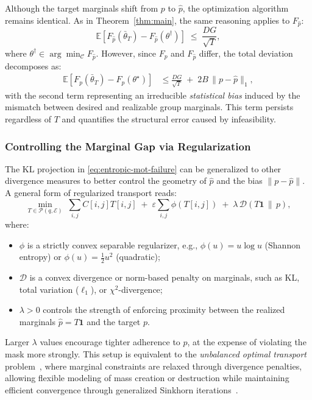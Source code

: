 \documentclass[9pt]{extarticle}
\theoremstyle{definition}
\renewcommand{\paragraph}[1]{\par\medskip\noindent{\bf #1}\hspace{0.5em}\ignorespaces}
\begin{document}
\paragraph{Convergence rate under infeasibility.}
Although the target marginals shift from $p$ to $\hat{p}$, the optimization algorithm remains identical.
As in Theorem~\ref{thm:main}, the same reasoning applies to $F_{\hat{p}}$:
\begin{equation}\label{eq:rate-hatp}
\mathbb{E}\!\left[F_{\hat{p}}(\bar{\theta}_T) - F_{\hat{p}}(\theta^\dagger)\right]
\;\le\; \frac{DG}{\sqrt{T}},
\end{equation}
where $\theta^\dagger\in\arg\min_{\mathcal{C}} F_{\hat{p}}$.
However, since $F_p$ and $F_{\hat{p}}$ differ, the total deviation decomposes as:
\begin{align}
\mathbb{E}\!\left[F_p(\bar{\theta}_T) - F_p(\theta^\star)\right]
&\le \frac{DG}{\sqrt{T}} \;+\; 2B\,\|p-\hat{p}\|_1,
\label{eq:infeasible-rate}
\end{align}
with the second term representing an irreducible \emph{statistical bias} induced by the mismatch between desired and realizable group marginals.
This term persists regardless of $T$ and quantifies the structural error caused by infeasibility.
\subsubsection{Controlling the Marginal Gap via Regularization}
The KL projection in \eqref{eq:entropic-mot-failure} can be generalized to other divergence measures to better control the geometry of $\hat{p}$ and the bias $\|p-\hat{p}\|$.
A general form of regularized transport reads:
\begin{equation}\label{eq:general-reg-failure}
\min_{T\in\mathcal{P}(q,\mathcal{E})}\;
\sum_{i,j} C[i,j]T[i,j]
\;+\;\varepsilon \sum_{i,j}\phi(T[i,j])
\;+\;\lambda\,\mathcal{D}\!\left(T\mathbf{1}\,\|\,p\right),
\end{equation}
where:
\begin{itemize}
    \item $\phi$ is a strictly convex separable regularizer, e.g., $\phi(u)=u\log u$ (Shannon entropy) or $\phi(u)=\tfrac{1}{2}u^2$ (quadratic);
    \item $\mathcal{D}$ is a convex divergence or norm-based penalty on marginals, such as KL, total variation ($\ell_1$), or $\chi^2$-divergence;
    \item $\lambda>0$ controls the strength of enforcing proximity between the realized marginals $\hat{p}=T\mathbf{1}$ and the target $p$.
\end{itemize}
Larger $\lambda$ values encourage tighter adherence to $p$, at the expense of violating the mask more strongly.
This setup is equivalent to the \emph{unbalanced optimal transport} problem~\cite{liero2018optimal,chizat2018scaling}, where marginal constraints are relaxed through divergence penalties, allowing flexible modeling of mass creation or destruction while maintaining efficient convergence through generalized Sinkhorn iterations~\cite{benamou2015iterative}.
\end{document}
